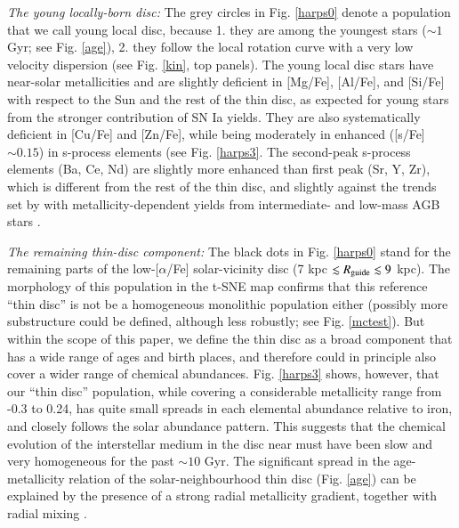 \documentclass{aa}  %
\begin{document}
{\it The young locally-born disc:} The grey circles in Fig. \ref{harps0} denote a population that we call young local disc, because 1. they are among the youngest stars ($\sim1$ Gyr; see Fig. \ref{age}), 2. they follow the local rotation curve with a very low velocity dispersion (see Fig. \ref{kin}, top panels). %
The young local disc stars have near-solar metallicities and are slightly deficient in [Mg/Fe], [Al/Fe], and [Si/Fe] with respect to the Sun and the rest of the thin disc, as expected for young stars from the stronger contribution of SN Ia yields. They are also systematically deficient in [Cu/Fe] and [Zn/Fe], while being moderately in enhanced ([s/Fe]$\sim0.15$) in s-process elements (see Fig. \ref{harps3}. The second-peak s-process elements (Ba, Ce, Nd) are slightly more enhanced than first peak (Sr, Y, Zr), which is different from the rest of the thin disc, and slightly against the trends set by with metallicity-dependent yields from intermediate- and low-mass AGB stars \citep[e.g.][]{Cristallo2009, Cristallo2015, daSilva2016, DelgadoMena2017}.

{\it The remaining thin-disc component:} The black dots in Fig. \ref{harps0} stand for the remaining parts of the low-[$\alpha$/Fe] solar-vicinity disc (7 kpc $\lesssim R_{\rm guide}\lesssim9$ kpc). The morphology of this population in the t-SNE map confirms that this reference ``thin disc'' is not be a homogeneous monolithic population either (possibly more substructure could be defined, although less robustly; see Fig. \ref{mctest}). But within the scope of this paper, we define the thin disc as a broad component that has a wide range of ages and birth places, and therefore could in principle also cover a wider range of chemical abundances. Fig. \ref{harps3} shows, however, that our ``thin disc'' population, while covering a considerable metallicity range from -0.3 to 0.24, has quite small spreads in each elemental abundance relative to iron, and closely follows the solar abundance pattern. This suggests that the chemical evolution of the interstellar medium in the disc near must have been slow and very homogeneous for the past $\sim10$ Gyr. The significant spread in the age-metallicity relation of the solar-neighbourhood thin disc (Fig. \ref{age}) can be explained by the presence of a strong radial metallicity gradient, together with radial mixing \citep[e.g.][Minchev et al., in prep.]{Haywood2006, Minchev2013, Anders2017a}.
\end{document}
